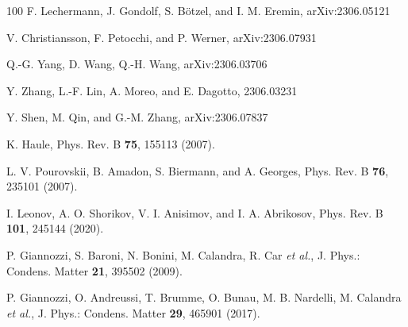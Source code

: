 \documentclass[prl,twocolumn,preprintnumbers,superscriptaddress]{revtex4-1}
\begin{document}
\begin{thebibliography}{100}
F. Lechermann, J. Gondolf, S. B\"otzel, and I. M. Eremin, arXiv:2306.05121

V. Christiansson, F. Petocchi, and P. Werner, arXiv:2306.07931

Q.-G. Yang, D. Wang, Q.-H. Wang, arXiv:2306.03706

Y. Zhang, L.-F. Lin, A. Moreo, and E. Dagotto, 2306.03231

Y. Shen, M. Qin, and G.-M. Zhang, arXiv:2306.07837


K. Haule, Phys. Rev. B \textbf{75}, 155113 (2007).

L. V. Pourovskii, B. Amadon, S. Biermann, and A. Georges, Phys. Rev. B \textbf{76}, 235101 (2007).

I. Leonov, A. O. Shorikov, V. I. Anisimov, and I. A. Abrikosov, Phys. Rev. B \textbf{101}, 245144 (2020).

P. Giannozzi, S. Baroni, N. Bonini, M. Calandra, R. Car \emph{et al.}, J. Phys.: Condens. Matter \textbf{21}, 395502 (2009).

P. Giannozzi, O. Andreussi, T. Brumme, O. Bunau, M. B. Nardelli, M. Calandra \emph{et al.}, J. Phys.: Condens. Matter \textbf{29}, 465901 (2017).


\end{thebibliography}
\end{document}
